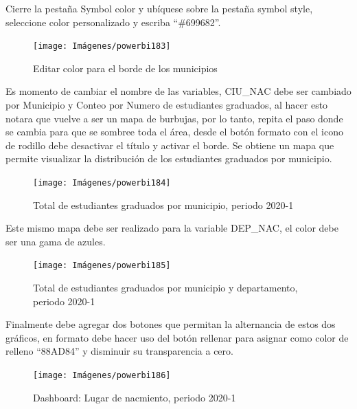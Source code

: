 \documentclass[
]{book}
\begin{document}
Cierre la pestaña Symbol color y ubíquese sobre la pestaña symbol style, seleccione color personalizado y escriba ``\#699682''.

\begin{figure}

{\centering \texttt{[image: Imágenes/powerbi183]} 

}

\caption{Editar color para el borde de los municipios}\label{fig:mapaarcgiseditarsimbologiacolorborde-fig}
\end{figure}

Es momento de cambiar el nombre de las variables, CIU\_NAC debe ser cambiado por Municipio y Conteo por Numero de estudiantes graduados, al hacer esto notara que vuelve a ser un mapa de burbujas, por lo tanto, repita el paso donde se cambia para que se sombree toda el área, desde el botón formato con el icono de rodillo debe desactivar el título y activar el borde. Se obtiene un mapa que permite visualizar la distribución de los estudiantes graduados por municipio.

\begin{figure}

{\centering \texttt{[image: Imágenes/powerbi184]} 

}

\caption{Total de estudiantes graduados por municipio, periodo 2020-1}\label{fig:mapaarcgismunicipiosperiodo20201-fig}
\end{figure}

Este mismo mapa debe ser realizado para la variable DEP\_NAC, el color debe ser una gama de azules.

\begin{figure}

{\centering \texttt{[image: Imágenes/powerbi185]} 

}

\caption{Total de estudiantes graduados por municipio y departamento, periodo 2020-1}\label{fig:mapaarcgismunicipiosperiododepartamento20201-fig}
\end{figure}

Finalmente debe agregar dos botones que permitan la alternancia de estos dos gráficos, en formato debe hacer uso del botón rellenar para asignar como color de relleno ``88AD84'' y disminuir su transparencia a cero.

\begin{figure}

{\centering \texttt{[image: Imágenes/powerbi186]} 

}

\caption{Dashboard: Lugar de nacmiento, periodo 2020-1}\label{fig:dashboardlugardenacmiento-fig}
\end{figure}
\end{document}
